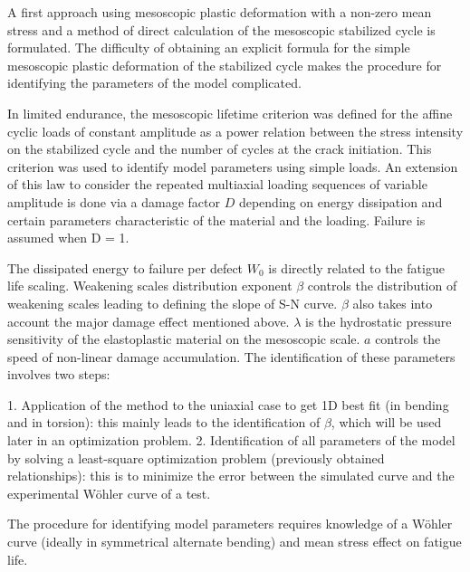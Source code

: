 A first approach using mesoscopic plastic deformation with a non-zero mean stress and a method of direct calculation of the mesoscopic stabilized cycle is formulated. The difficulty of obtaining an explicit formula for the simple mesoscopic plastic deformation of the stabilized cycle makes the procedure for identifying the parameters of the model complicated. 

In limited endurance, the mesoscopic lifetime criterion was defined for the affine cyclic loads of constant amplitude as a power relation between the stress intensity on the stabilized cycle and the number of cycles at the crack initiation. This criterion was used to identify model parameters using simple loads. An extension of this law to consider the repeated multiaxial loading sequences of variable amplitude is done via a damage factor $D$ depending on energy dissipation and certain parameters characteristic of the material and the loading. Failure is assumed when D = 1.


The dissipated energy to failure per defect  $W_0$ is directly related to the fatigue life scaling. Weakening scales distribution exponent  $\beta$ controls the distribution of weakening scales leading to defining the slope of S-N curve. $\beta$ also takes into account the major damage effect mentioned above.  $\lambda$ is the hydrostatic pressure sensitivity of the elastoplastic material on the mesoscopic scale.  $a$ controls the speed of non-linear damage accumulation. The identification of these parameters involves two steps:

1. Application of the method to the uniaxial case to get 1D best fit (in bending and in torsion): this mainly leads to the identification of $\beta$, which will be used later in an optimization problem.
2. Identification of all parameters of the model by solving a least-square optimization problem (previously obtained relationships): this is to minimize the error between the simulated curve and the experimental Wöhler curve of a test.

The procedure for identifying model parameters requires knowledge of a Wöhler curve (ideally in symmetrical alternate bending) and mean stress effect on fatigue life.

